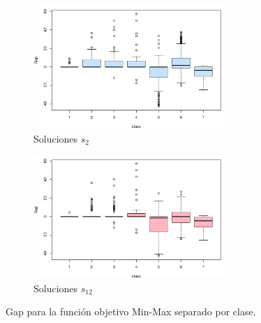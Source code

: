 \documentclass[preprint,12pt,authoryear]{elsarticle}
\begin{document}
\begin{figure}
	\begin{subfigure}{\textwidth}
		\centering
		\includegraphics[width=0.8\textwidth]{box_gap2.png}
		\caption{Soluciones $s_2$}
	\end{subfigure}
	\begin{subfigure}{\textwidth}
		\centering
		\includegraphics[width=0.8\textwidth]{box_gap12.png}
		\caption{Soluciones $s_{12}$}
	\end{subfigure}
	\caption{Gap para la función objetivo Min-Max separado por clase.}
	\label{boxob2}
\end{figure}
\end{document}
